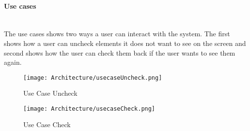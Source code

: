 \documentclass[../document.tex]{subfiles}
\begin{document}
\paragraph{Use cases} \ \\
The use cases shows two ways a user can interact with the system. The first shows how a user can uncheck elements it does not want to see on the screen and second shows how the user can check them back if the user wants to see them again.

\begin{figure}[H]
	\centering
	\texttt{[image: Architecture/usecaseUncheck.png]}
	\caption{Use Case Uncheck}
\end{figure}

\begin{figure}[H]
	\centering
	\texttt{[image: Architecture/usecaseCheck.png]}
	\caption{Use Case Check}
\end{figure}
\end{document}
